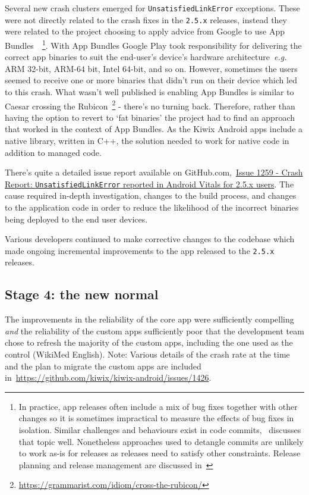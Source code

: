Several new crash clusters emerged for \texttt{UnsatisfiedLinkError} exceptions. These were not directly related to the crash fixes in the \texttt{2.5.x} releases, instead they were related to the project choosing to apply advice from Google to use App Bundles~\citep{android_app_bundle}~\footnote{In practice, app releases often include a mix of bug fixes together with other changes so it is sometimes impractical to measure the effects of bug fixes in isolation. Similar challenges and behaviours exist in code commits,~\citep{partachi2020_flexme_untangling_commits} discusses that topic well. Nonetheless approaches used to detangle commits are unlikely to work as-is for releases as releases need to satisfy other constraints. Release planning and release management are discussed in~\href{chapter-related-work}{}}.
%
With App Bundles Google Play took responsibility for delivering the correct app binaries to suit the end-user's device's hardware architecture~\emph{e.g.} ARM 32-bit, ARM-64 bit, Intel 64-bit, and so on. However, sometimes the users seemed to receive one or more binaries that didn't run on their device which led to this crash. What wasn't well published is enabling App Bundles is similar to Caesar crossing the Rubicon~\footnote{\url{https://grammarist.com/idiom/cross-the-rubicon/}} - there's no turning back. Therefore, rather than having the option to revert to `fat binaries' the project had to find an approach that worked in the context of App Bundles. As the Kiwix Android apps include a native library, written in C++, the solution needed to work for native code in addition to managed code.

There's quite a detailed issue report available on GitHub.com,~\href{https://github.com/kiwix/kiwix-android/issues/1259}{Issue 1259 - Crash Report: \texttt{UnsatisfiedLinkError} reported in Android Vitals for 2.5.x users}. The cause required in-depth investigation, changes to the build process, and changes to the application code in order to reduce the likelihood of the incorrect binaries being deployed to the end user devices.

Various developers continued to make corrective changes to the codebase which made ongoing incremental improvements to the app released to the \texttt{2.5.x} releases.

\subsection{Stage 4: the new normal}
The improvements in the reliability of the core app were sufficiently compelling \emph{and} the reliability of the custom apps sufficiently poor that the development team chose to refresh the majority of the custom apps, including the one used as the control (WikiMed English). Note: Various details of the crash rate at the time and the plan to migrate the custom apps are included in~\url{https://github.com/kiwix/kiwix-android/issues/1426}. 

